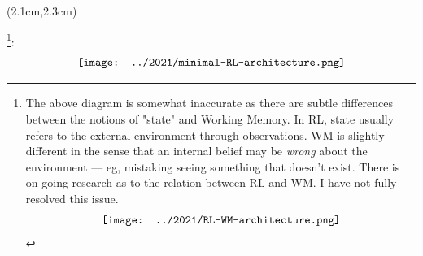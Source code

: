 \begin{preview}

\cc{
\title{\vspace{-2.2cm} \bfseries\color{blue}{\large 逻辑化 AGI 基础}}
}{
\title{\vspace{-2.2cm} \bfseries\color{blue}{\large Logicalized AGI basics}}
}

\date{\vspace{-3.2cm}} %

\maketitle

\setcounter{section}{-1}

\begin{textblock*}{5cm}(2.1cm,2.3cm) %
{}
\end{textblock*}

\begin{minipage}{\textwidth}
\setlength{\parskip}{0.4\baselineskip}

\footnote{The above diagram is somewhat inaccurate as there are subtle differences between the notions of "state" and Working Memory.  In RL, state usually refers to the external environment  through observations.  WM is slightly different in the sense that an internal belief may be \textit{wrong} about the environment --- eg, mistaking seeing something that doesn't exist.  There is on-going research as to the relation between RL and WM.  I have not fully resolved this issue.
	\begin{equation}
	\vcenter{\hbox{\texttt{[image: ../2021/RL-WM-architecture.png]}}}
	\end{equation}
	\vspace{-0.7cm}}:
\begin{equation}
\vcenter{\hbox{\texttt{[image: ../2021/minimal-RL-architecture.png]}}}
\end{equation}


\end{minipage}
\end{preview}

